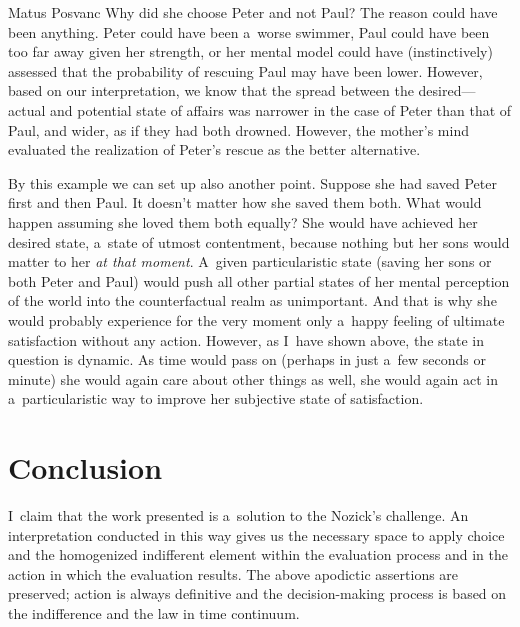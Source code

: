 \begin{artengenv}{Matus Posvanc}
Why did she choose Peter and not Paul? The reason could have been anything. Peter could have been a~worse swimmer, Paul could have been too far away given her strength, or her mental model could have (instinctively) assessed that the probability of rescuing Paul may have been lower. However, based on our interpretation, we know that the spread between the desired--- actual and potential state of affairs was narrower in the case of Peter than that of Paul, and wider, as if they had both drowned. However, the mother's mind evaluated the realization of Peter's rescue as the better alternative.



By this example we can set up also another point. Suppose she had saved Peter first and then Paul. It doesn't matter how she saved them both. What would happen assuming she loved them both equally? She would have achieved her desired state, a~state of utmost contentment, because nothing but her sons would matter to her \textit{at that moment}. A~given particularistic state (saving her sons or both Peter and Paul) would push all other partial states of her mental perception of the world into the counterfactual realm as unimportant. And that is why she would probably experience for the very moment only a~happy feeling of ultimate satisfaction without any action. However, as I~have shown above, the state in question is dynamic. As time would pass on (perhaps in just a~few seconds or minute) she would again care about other things as well, she would again act in a~particularistic way to improve her subjective state of satisfaction.



\section{Conclusion}



I~claim that the work presented is a~solution to the Nozick's challenge. An interpretation conducted in this way gives us the necessary space to apply choice and the homogenized indifferent element within the evaluation process and in the action in which the evaluation results. The above apodictic assertions are preserved; action is always definitive and the decision-making process is based on the indifference and the law in time continuum.




\end{artengenv}
